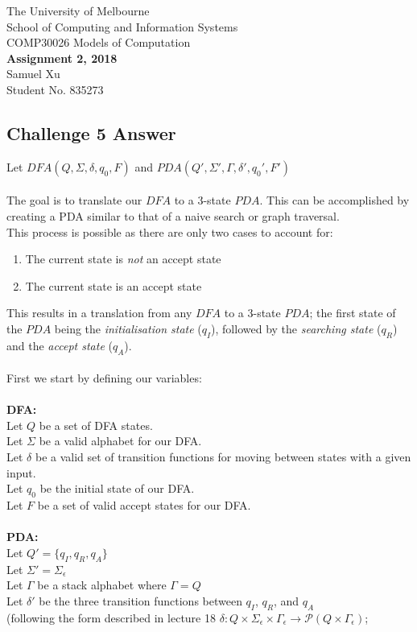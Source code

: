 \documentclass[12pt]{article}
\begin{document}
\begin{center}
{\sc The University of Melbourne
\\
School of Computing and Information Systems
\\ 
COMP30026 Models of Computation}
\bigskip \\
{\Large\bf Assignment 2, 2018}
\bigskip \\
Samuel Xu \\
Student No. 835273
\end{center}

\subsection*{Challenge 5 Answer}

Let $DFA (Q, \Sigma, \delta, q_0, F)$ and $PDA (Q', \Sigma', \Gamma, \delta', q_0', F')$ \\\\
The goal is to translate our $DFA$ to a 3-state $PDA$. This can be accomplished by creating a PDA similar to that of a naive search or graph traversal. \\
This process is possible as there are only two cases to account for:
\begin{enumerate}  
\item The current state is \textit{not} an accept state
\item The current state is an accept state
\end{enumerate} 
This results in a translation from any $DFA$ to a 3-state $PDA$; 
the first state of the $PDA$ being the \textit{initialisation state} ($q_I$), 
followed by the \textit{searching state} ($q_R$) and the \textit{accept state} ($q_A$).\\\\
First we start by defining our variables:\\\\
\textbf{DFA:} \\
Let $Q$ be a set of DFA states. \\
Let $\Sigma$ be a valid alphabet for our DFA. \\
Let $\delta$ be a valid set of transition functions for moving between states with a given input. \\
Let $q_0$ be the initial state of our DFA. \\
Let $F$ be a set of valid accept states for our DFA. \\\\
\textbf{PDA:} \\ 
Let $Q' = \{q_I, q_R, q_A\}$ \\
Let $\Sigma' = \Sigma_\epsilon$ \\
Let $\Gamma$ be a stack alphabet where $\Gamma = Q$ \\
Let $\delta'$ be the three transition functions between $q_I$, $q_R$, and $q_A$ \\ (following the form described in lecture 18 $\delta : Q \times \Sigma_\epsilon \times \Gamma_\epsilon \rightarrow \mathcal{P}(Q \times \Gamma_\epsilon)$;
\end{document}
